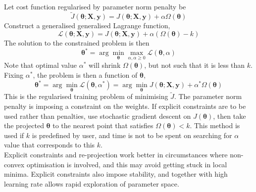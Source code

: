 \begin{remark} \\
Let cost function regularised by parameter norm penalty be
\begin{equation}
\tilde{J}(\bm{\theta}; \bm{X}, \bm{y}) = J(\bm{\theta}; \bm{X}, \bm{y}) + \alpha \Omega(\bm{\theta}) \nonumber
\end{equation}
Construct a generalised generalised Lagrange function,
\begin{equation}
\mathcal{L}(\bm{\theta}; \bm{X}, \bm{y}) = J(\bm{\theta}; \bm{X}, \bm{y}) + \alpha (\Omega(\bm{\theta}) - k) \nonumber
\end{equation}
The solution to the constrained problem is then
\begin{equation}
\bm{\theta}^* = \arg \min_{\bm{\theta}} \max_{\alpha, \alpha \geq 0} \mathcal{L} (\bm{\theta}, \alpha) \nonumber
\end{equation}
Note that optimal value $\alpha^*$ will shrink $\Omega(\bm{\theta})$, but not such that it is less than $k$.\\
Fixing $\alpha^*$, the problem is then a function of $\bm{\theta}$,
\begin{equation}
\bm{\theta}^* = \arg \min_{\bm{\theta}} \mathcal{L} (\bm{\theta}, \alpha^*) = \arg \min_{\bm{\theta}} J(\bm{\theta}; \bm{X}, \bm{y}) + \alpha^* \Omega (\bm{\theta}) \nonumber
\end{equation}
This is the regularised training problem of minimising $\tilde{J}$. The parameter norm penalty is imposing a constraint on the weights. If explicit constraints are to be used rather than penalties, use stochastic gradient descent on $J(\bm{\theta})$, then take the projected $\bm{\theta}$ to the nearest point that satisfies $\Omega(\bm{\theta}) < k$. This method is used if $k$ is predefined by user, and time is not to be spent on searching for $\alpha$ value that corresponds to this $k$.\\
Explicit constraints and re-projection work better in circumstances where non-convex optimisation is involved, and this may avoid getting stuck in local minima. Explicit constraints also impose stability, and together with high learning rate allows rapid exploration of parameter space.
\end{remark}
